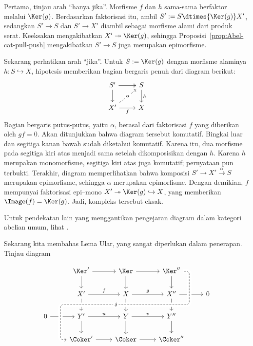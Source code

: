 \begin{bukti}
	Pertama, tinjau arah ``hanya jika''. Morfisme $f$ dan $h$ sama-sama
	berfaktor melalui $\Ker(g)$. Berdasarkan faktorisasi itu, ambil
	$S' := S \dtimes{\Ker(g)} X'$, sedangkan $S' \to S$ dan $S' \to X'$ diambil
	sebagai morfisme alami dari produk serat. Keeksakan mengakibatkan
	$X' \twoheadrightarrow \Ker(g)$, sehingga
	Proposisi~\ref{prop:Abel-cat-pull-push} mengakibatkan $S' \to S$ juga
	merupakan epimorfisme.

	Sekarang perhatikan arah ``jika''. Untuk $S := \Ker(g)$ dengan morfisme
	alaminya $h: S \hookrightarrow X$, hipotesis memberikan bagian bergaris
	penuh dari diagram berikut:
	\[\begin{tikzcd}
		S' \arrow[d] \arrow[twoheadrightarrow, r] & S \arrow[d, "h"] \\
		X' \arrow[dashed, ru, "\alpha" description] \arrow[r, "f"'] & X
	\end{tikzcd}\]
	Bagian bergaris putus-putus, yaitu $\alpha$, berasal dari faktorisasi $f$
	yang diberikan oleh $gf=0$. Akan ditunjukkan bahwa diagram tersebut komutatif.
	Bingkai luar dan segitiga kanan bawah sudah diketahui komutatif. Karena itu,
	dua morfisme pada segitiga kiri atas menjadi sama setelah dikomposisikan
	dengan $h$. Karena $h$ merupakan monomorfisme, segitiga kiri atas juga
	komutatif; pernyataan pun terbukti. Terakhir, diagram memperlihatkan bahwa
	komposisi $S' \to X' \xrightarrow{\alpha} S$ merupakan epimorfisme, sehingga
	$\alpha$ merupakan epimorfisme. Dengan demikian, $f$ mempunyai faktorisasi
	epi--mono $X' \twoheadrightarrow \Ker(g) \hookrightarrow X$, yang memberikan
	$\Image(f) = \Ker(g)$. Jadi, kompleks tersebut eksak.
\end{bukti}

Untuk pendekatan lain yang menggantikan pengejaran diagram dalam kategori
abelian umum, lihat \cite[Tag 05PL]{stacks}.

Sekarang kita membahas Lema Ular, yang sangat diperlukan dalam penerapan.
Tinjau diagram

\begin{equation}\label{eqn:snake}
\begin{tikzcd}
	& \Ker' \arrow[r] \arrow[d] & \Ker \arrow[r] \arrow[d] & \Ker'' \arrow[d] & \\
	& X' \arrow[d] \arrow[r, "f"]  & X \arrow[d] \arrow[r, "g"]  & X'' \arrow[r] \arrow[d, ""{coordinate, name=Z}] & 0  \\
	0 \arrow[r] & Y' \arrow[r, "u"] \arrow[d] & Y \arrow[r, "v"] \arrow[d] & Y'' \arrow[d] & \\
	& \Coker' \arrow[uuurr, "\delta" description, crossing over, dashed, leftarrow, rounded corners, to path= {-- ([xshift=-2ex]\tikztostart.west) |- (Z) [near end]\tikztonodes -| ([xshift=2ex]\tikztotarget.east) -- (\tikztotarget) } ] \arrow[r] & \Coker \arrow[r] & \Coker'' &
\end{tikzcd}
\end{equation}

